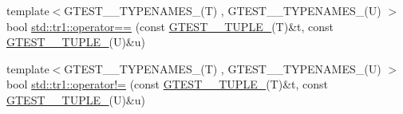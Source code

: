 \begin{DoxyCompactItemize}
\item 
{\footnotesize template$<$G\-T\-E\-S\-T\-\_\-\_\-\-T\-Y\-P\-E\-N\-A\-M\-E\-S\-\_\-(\-T) , G\-T\-E\-S\-T\-\_\-\_\-\-T\-Y\-P\-E\-N\-A\-M\-E\-S\-\_\-(\-U) $>$ }\\bool \hyperlink{namespacestd_1_1tr1_af4516de784404381f9b14797694b6311}{std\-::tr1\-::operator==} (const \hyperlink{gtest-tuple_8h_a275e7bcd84299cc44b9c1dba971951c4}{G\-T\-E\-S\-T\-\_\-\_\-\-T\-U\-P\-L\-E\-\_\-}(T)\&t, const \hyperlink{gtest-tuple_8h_a275e7bcd84299cc44b9c1dba971951c4}{G\-T\-E\-S\-T\-\_\-\_\-\-T\-U\-P\-L\-E\-\_\-}(U)\&u)
\item 
{\footnotesize template$<$G\-T\-E\-S\-T\-\_\-\_\-\-T\-Y\-P\-E\-N\-A\-M\-E\-S\-\_\-(\-T) , G\-T\-E\-S\-T\-\_\-\_\-\-T\-Y\-P\-E\-N\-A\-M\-E\-S\-\_\-(\-U) $>$ }\\bool \hyperlink{namespacestd_1_1tr1_a058882c51de469b5e78d29076f864940}{std\-::tr1\-::operator!=} (const \hyperlink{gtest-tuple_8h_a275e7bcd84299cc44b9c1dba971951c4}{G\-T\-E\-S\-T\-\_\-\_\-\-T\-U\-P\-L\-E\-\_\-}(T)\&t, const \hyperlink{gtest-tuple_8h_a275e7bcd84299cc44b9c1dba971951c4}{G\-T\-E\-S\-T\-\_\-\_\-\-T\-U\-P\-L\-E\-\_\-}(U)\&u)
\end{DoxyCompactItemize}


